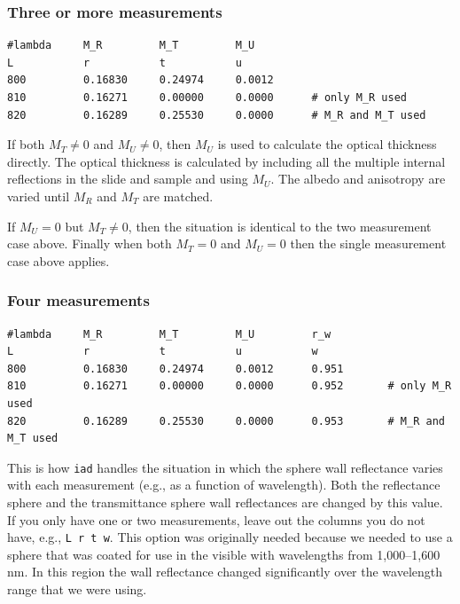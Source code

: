 \documentclass{article}
\newcommand\iadprog{\texttt{iad}}
\begin{document}
\subsubsection{Three or more measurements}

\begin{center}
\begin{minipage}{11cm}
\scriptsize
\begin{verbatim}
#lambda     M_R         M_T         M_U
L           r           t           u
800         0.16830     0.24974     0.0012
810         0.16271     0.00000     0.0000      # only M_R used
820         0.16289     0.25530     0.0000      # M_R and M_T used
\end{verbatim}
\end{minipage}
\end{center}
If both $M_T\ne0$ and $M_U\ne0$, then $M_U$ is used to calculate
the optical thickness directly.  The optical thickness is calculated by including
all the multiple internal reflections in the slide and sample and
using $M_U$.  
The albedo and anisotropy are varied until $M_R$ and $M_T$ are
matched. 

If $M_U=0$ but $M_T\ne0$, then the situation is identical to the two measurement
case above.  Finally when both $M_T=0$ and $M_U=0$ then the single measurement 
case above applies.

\subsubsection{Four measurements}

\begin{center}
\begin{minipage}{12cm}
\scriptsize
\begin{verbatim}
#lambda     M_R         M_T         M_U         r_w
L           r           t           u           w
800         0.16830     0.24974     0.0012      0.951
810         0.16271     0.00000     0.0000      0.952       # only M_R used
820         0.16289     0.25530     0.0000      0.953       # M_R and M_T used
\end{verbatim}
\end{minipage}
\end{center}
This is how \iadprog{} handles the situation in which the sphere wall reflectance varies
with each measurement (e.g., as a function of wavelength).  Both the
reflectance sphere and the transmittance sphere wall reflectances are
changed by this value.  If you only have one or two measurements, leave
out the columns you do not have, e.g., \texttt{L r t w}.
This option was originally needed because we needed to use a sphere that was coated
for use in the visible with wavelengths from 1,000--1,600\,nm.  In this region the wall reflectance
changed significantly over the wavelength range that we were using.
\end{document}
